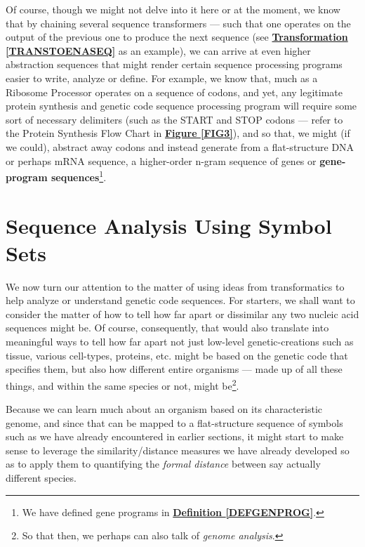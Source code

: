 \documentclass[a4paper, 18pt]{book} %
\begin{document}
Of course, though we might not delve into it here or at the moment, we know that by chaining several sequence transformers --- such that one operates on the output of the previous one to produce the next sequence (see \textbf{\hyperref[TRANSTOENASEQ]{Transformation \ref{TRANSTOENASEQ}}} as an example), we can arrive at even higher abstraction sequences that might render certain sequence processing programs easier to write, analyze or define. For example, we know that, much as a Ribosome Processor operates on a sequence of codons, and yet, any legitimate protein synthesis and genetic code sequence processing program will require some sort of necessary delimiters (such as the START and STOP codons --- refer to the Protein Synthesis Flow Chart in \textbf{\hyperref[FIG3]{Figure \ref{FIG3}}}), and so that, we might (if we could), abstract away codons and instead generate from a flat-structure DNA or perhaps mRNA sequence, a higher-order n-gram sequence of genes or \textbf{gene-program sequences}\footnote{We have defined gene programs in \textbf{\hyperref[DEFGENPROG]{Definition \ref{DEFGENPROG}}}.}.


\chapter{Sequence Analysis Using Symbol Sets}
\label{SEC3}


We now turn our attention to the matter of using ideas from transformatics to help analyze or understand genetic code sequences. For starters, we shall want to consider the matter of how to tell how far apart or dissimilar any two nucleic acid sequences might be. Of course, consequently, that would also translate into meaningful ways to tell how far apart not just low-level genetic-creations such as tissue, various cell-types, proteins, etc. might be based on the genetic code that specifies them, but also how different entire organisms --- made up of all these things, and within the same species or not, might be\footnote{So that then, we perhaps can also talk of \textit{genome analysis}.}.

Because we can learn much about an organism based on its characteristic genome, and since that can be mapped to a flat-structure sequence of symbols such as we have already encountered in earlier sections, it might start to make sense to leverage the similarity/distance measures we have already developed so as to apply them to quantifying the \textit{formal distance} between say actually different species. 
\end{document}

